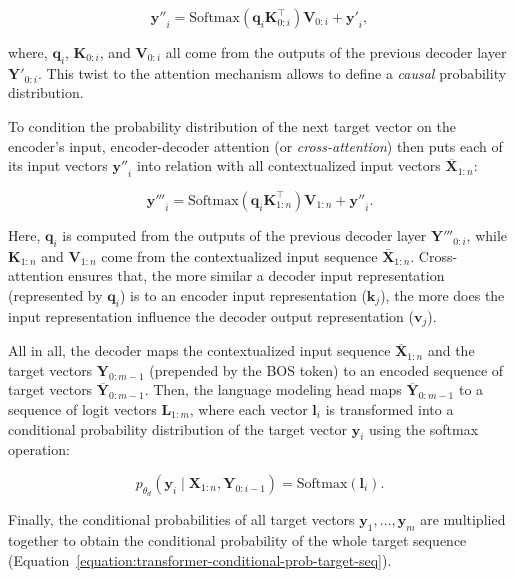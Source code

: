 \begin{equation}
    \bm{y''}_i = \mathrm{Softmax}(\bm{q}_i \bm{K}^{\top}_{0:i}) \bm{V}_{0:i} + \bm{y'}_i,
\end{equation}

where, $\bm{q}_i$, $\bm{K}_{0:i}$, and $\bm{V}_{0:i}$ all come from the outputs of the previous decoder layer $\bm{Y'}_{0:i}$. This twist to the attention mechanism allows to define a \textit{causal} probability distribution.

To condition the probability distribution of the next target vector on the encoder's input, encoder-decoder attention (or \textit{cross-attention}) then puts each of its input vectors $\bm{y''}_i$ into relation with all contextualized input vectors $\overline{\bm{X}}_{1:n}$:

\begin{equation}
    \bm{y'''}_i = \mathrm{Softmax}(\bm{q}_i \bm{K}^{\top}_{1:n}) \bm{V}_{1:n} + \bm{y''}_i.
\end{equation}

Here, $\bm{q}_i$ is computed from the outputs of the previous decoder layer $\bm{Y'''}_{0:i}$, while $\bm{K}_{1:n}$ and $\bm{V}_{1:n}$ come from the contextualized input sequence $\overline{\bm{X}}_{1:n}$. Cross-attention ensures that, the more similar a decoder input representation (represented by $\bm{q}_i$) is to an encoder input representation ($\bm{k}_j$), the more does the input representation influence the decoder output representation ($\bm{v}_j$).

All in all, the decoder maps the contextualized input sequence $\overline{\bm{X}}_{1:n}$ and the target vectors $\bm{Y}_{0:m-1}$ (prepended by the \ac{BOS} token) to an encoded sequence of target vectors $\overline{\bm{Y}}_{0:m-1}$. Then, the language modeling head maps $\overline{\bm{Y}}_{0:m-1}$ to a sequence of logit vectors $\bm{L}_{1:m}$, where each vector $\bm{l}_i$ is transformed into a conditional probability distribution of the target vector $\bm{y}_i$ using the softmax operation:

\begin{equation}
    p_{\theta_d}(\bm{y}_i \mid \bm{X}_{1:n}, \bm{Y}_{0:i-1}) = \mathrm{Softmax}(\bm{l}_i).
\end{equation}

Finally, the conditional probabilities of all target vectors $\bm{y}_1, \ldots, \bm{y}_m$ are multiplied together to obtain the conditional probability of the whole target sequence (Equation~\ref{equation:transformer-conditional-prob-target-seq}).

